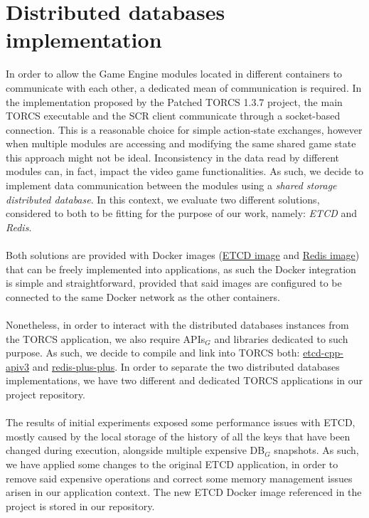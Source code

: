 \section{Distributed databases implementation}
In order to allow the Game Engine modules located in different containers to communicate with each other, a dedicated mean of communication is required. In the implementation proposed by the Patched TORCS 1.3.7 project, the main TORCS executable and the SCR client communicate through a socket-based connection. This is a reasonable choice for simple action-state exchanges, however when multiple modules are accessing and modifying the same shared game state this approach might not be ideal. Inconsistency in the data read by different modules can, in fact, impact the video game functionalities. As such, we decide to implement data communication between the modules using a \textit{shared storage distributed database}. In this context, we evaluate two different solutions, considered to both to be fitting for the purpose of our work, namely: \textit{ETCD} and \textit{Redis}. \\ \\
Both solutions are provided with Docker images (\href{https://hub.docker.com/r/bitnami/etcd}{ETCD image} and \href{https://hub.docker.com/_/redis}{Redis image}) that can be freely implemented into applications, as such the Docker integration is simple and straightforward, provided that said images are configured to be connected to the same Docker network as the other containers. \\ \\
Nonetheless, in order to interact with the distributed databases instances from the TORCS application, we also require APIs$_G$ and libraries dedicated to such purpose. As such, we decide to compile and link into TORCS both: \href{https://github.com/etcd-cpp-apiv3/etcd-cpp-apiv3}{etcd-cpp-apiv3} and \href{https://github.com/sewenew/redis-plus-plus}{redis-plus-plus}. In order to separate the two distributed databases implementations, we have two different and dedicated TORCS applications in our project repository. \\ \\
The results of initial experiments exposed some performance issues with ETCD, mostly caused by the local storage of the history of all the keys that have been changed during execution, alongside multiple expensive DB$_G$ snapshots. As such, we have applied some changes to the original ETCD application, in order to remove said expensive operations and correct some memory management issues arisen in our application context. The new ETCD Docker image referenced in the project is stored in our repository.

